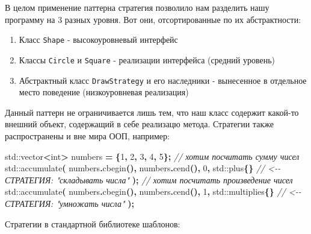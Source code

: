 \documentclass[14pt,a4paper]{article}
\providecommand{\tightlist}{%
	\setlength{\itemsep}{0pt}\setlength{\parskip}{0pt}}
\newenvironment{Shaded}{\begin{paragraph}}{\end{paragraph}}
\newenvironment{Highlighting}{\begin{paragraph}}{\end{paragraph}}
\newcommand{\DataTypeTok}[1]{\textcolor[rgb]{0.13,0.29,0.53}{#1}}
\newcommand{\DecValTok}[1]{\textcolor[rgb]{0.00,0.00,0.81}{#1}}
\newcommand{\CommentTok}[1]{\textcolor[rgb]{0.56,0.35,0.01}{\textit{#1}}}
\newcommand{\OperatorTok}[1]{\textcolor[rgb]{0.81,0.36,0.00}{\textbf{#1}}}
\newcommand{\BuiltInTok}[1]{#1}
\newcommand{\NormalTok}[1]{#1}
\begin{document}
В целом применение паттерна стратегия позволило нам разделить нашу
программу на 3 разных уровня. Вот они, отсортированные по их
абстрактности:

\begin{enumerate}
\def\labelenumi{\arabic{enumi}.}
\tightlist
\item
  Класс \texttt{Shape} - высокоуровневый интерфейс
\item
  Классы \texttt{Circle} и \texttt{Square} - реализации интерфейса
  (средний уровень)
\item
  Абстрактный класс \texttt{DrawStrategy} и его наследники - вынесенное
  в отдельное место поведение (низкоуровневая реализация)
\end{enumerate}

Данный паттерн не ограничивается лишь тем, что наш класс содержит
какой-то внешний объект, содержащий в себе реализацю метода. Стратегии
также распространены и вне мира ООП, например:

\begin{Shaded}
\begin{Highlighting}[]
\BuiltInTok{std::}\NormalTok{vector}\OperatorTok{\textless{}}\DataTypeTok{int}\OperatorTok{\textgreater{}}\NormalTok{ numbers }\OperatorTok{=} \OperatorTok{\{}\DecValTok{1}\OperatorTok{,} \DecValTok{2}\OperatorTok{,} \DecValTok{3}\OperatorTok{,} \DecValTok{4}\OperatorTok{,} \DecValTok{5}\OperatorTok{\};}
\CommentTok{// хотим посчитать сумму чисел}
\BuiltInTok{std::}\NormalTok{accumulate}\OperatorTok{(}
\NormalTok{        numbers}\OperatorTok{.}\NormalTok{cbegin}\OperatorTok{(),}
\NormalTok{        numbers}\OperatorTok{.}\NormalTok{cend}\OperatorTok{(),}
        \DecValTok{0}\OperatorTok{,}
        \BuiltInTok{std::}\NormalTok{plus}\OperatorTok{\{\}} \CommentTok{// \textless{}{-}{-} СТРАТЕГИЯ: "складывать числа"}
\OperatorTok{);}
\CommentTok{// хотим посчитать произведение чисел}
\BuiltInTok{std::}\NormalTok{accumulate}\OperatorTok{(}
\NormalTok{        numbers}\OperatorTok{.}\NormalTok{cbegin}\OperatorTok{(),}
\NormalTok{        numbers}\OperatorTok{.}\NormalTok{cend}\OperatorTok{(),}
        \DecValTok{1}\OperatorTok{,}
        \BuiltInTok{std::}\NormalTok{multiplies}\OperatorTok{\{\}} \CommentTok{// \textless{}{-}{-} СТРАТЕГИЯ: "умножать числа"}
\OperatorTok{);}
\end{Highlighting}
\end{Shaded}

Стратегии в стандартной библиотеке шаблонов:
\end{document}

